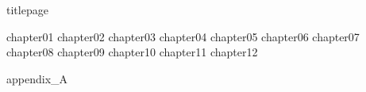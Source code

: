 \documentclass[
	,a4paper
	,12pt
	,oneside
]{book}
\begin{document}
\frontmatter
	{titlepage}
	\restoregeometry
	\tableofcontents

\mainmatter

	{chapter01}
	{chapter02}
	{chapter03}
	{chapter04}
	{chapter05}
	{chapter06}
	{chapter07}
	{chapter08}
	{chapter09}
	{chapter10}
	{chapter11}
	{chapter12}
	
	\appendix
	{appendix_A}

\backmatter
\end{document}
